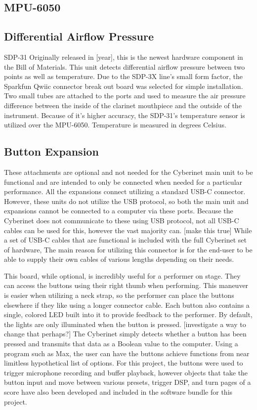 \subsection{MPU-6050}


\subsection{Differential Airflow Pressure}

SDP-31
Originally released in [year], this is the newest hardware component in the Bill of Materials. This unit detects differential airflow pressure between two points as well as temperature. Due to the SDP-3X line’s small form factor, the Sparkfun Qwiic connector break out board was selected for simple installation. Two small tubes are attached to the ports and used to measure the air pressure difference between the inside of the clarinet mouthpiece and the outside of the instrument.
Because of it’s higher accuracy, the SDP-31’s temperature sensor is utilized over the MPU-6050. Temperature is measured in degrees Celsius.

\subsection{Button Expansion}

These attachments are optional and not needed for the Cyberinet main unit to be functional and are intended to only be connected when needed for a particular performance. All the expansions connect utilizing a standard USB-C connector. However, these units do not utilize the USB protocol, so both the main unit and expansions cannot be connected to a computer via these ports. Because the Cyberinet does not communicate to these using USB protocol, not all USB-C cables can be used for this, however the vast majority can. [make this true] While a set of USB-C cables that are functional is included with the full Cyberinet set of hardware, The main reason for utilizing this connector is for the end-user to be able to supply their own cables of various lengths depending on their needs. 

This board, while optional, is incredibly useful for a performer on stage. They can access the buttons using their right thumb when performing. This maneuver is easier when utilizing a neck strap, so the performer can place the buttons elsewhere if they like using a longer connector cable. Each button also contains a single, colored LED built into it to provide feedback to the performer. By default, the lights are only illuminated when the button is pressed. [investigate a way to change that perhaps?] The Cyberinet simply detects whether a button has been pressed and transmits that data as a Boolean value to the computer. Using a program such as Max, the user can have the buttons achieve functions from near limitless hypothetical list of options. For this project, the buttons were used to trigger microphone recording and buffer playback, however objects that take the button input and move between various presets, trigger DSP, and turn pages of a score have also been developed and included in the software bundle for this project.


